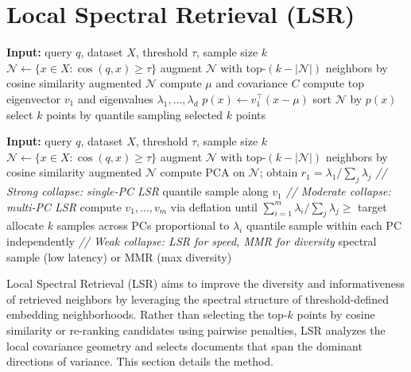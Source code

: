 \documentclass{article}
\begin{document}
\section{Local Spectral Retrieval (LSR)}

\begin{algorithm}[h]
\caption{Local Spectral Retrieval (LSR)}
\begin{algorithmic}
\STATE \textbf{Input:} query $q$, dataset $X$, threshold $\tau$, sample size $k$
\STATE $\mathcal{N} \leftarrow \{ x \in X : \cos(q,x) \geq \tau \}$
  \STATE augment $\mathcal{N}$ with top-$(k - |\mathcal{N}|)$ neighbors by cosine similarity
  \RETURN augmented $\mathcal{N}$
\ENDIF
\STATE compute $\mu$ and covariance $C$
\STATE compute top eigenvector $v_1$ and eigenvalues $\lambda_1, \ldots, \lambda_d$
  \STATE $p(x) \leftarrow v_1^\top (x - \mu)$
\ENDFOR
\STATE sort $\mathcal{N}$ by $p(x)$
\STATE select $k$ points by quantile sampling
\RETURN selected $k$ points
\end{algorithmic}
\end{algorithm}

\begin{algorithm}[h]
\caption{LSR with Spectral Diagnostics (Inner Layer)}
\begin{algorithmic}
\STATE \textbf{Input:} query $q$, dataset $X$, threshold $\tau$, sample size $k$
\STATE $\mathcal{N} \leftarrow \{ x \in X : \cos(q,x) \geq \tau \}$
  \STATE augment $\mathcal{N}$ with top-$(k - |\mathcal{N}|)$ neighbors by cosine similarity
  \RETURN augmented $\mathcal{N}$
\ENDIF
\STATE compute PCA on $\mathcal{N}$; obtain $r_1 = \lambda_1 / \sum_j \lambda_j$
  \STATE \textit{// Strong collapse: single-PC LSR}
  \RETURN quantile sample along $v_1$
  \STATE \textit{// Moderate collapse: multi-PC LSR}
  \STATE compute $v_1, \ldots, v_m$ via deflation until $\sum_{i=1}^{m} \lambda_i / \sum_j \lambda_j \geq$ target
  \STATE allocate $k$ samples across PCs proportional to $\lambda_i$
  \RETURN quantile sample within each PC independently
\ELSE
  \STATE \textit{// Weak collapse: LSR for speed, MMR for diversity}
  \RETURN spectral sample (low latency) or MMR (max diversity)
\ENDIF
\end{algorithmic}
\end{algorithm}

Local Spectral Retrieval (LSR) aims to improve the diversity and informativeness of retrieved neighbors by leveraging the spectral structure of threshold-defined embedding neighborhoods. Rather than selecting the top-$k$ points by cosine similarity or re-ranking candidates using pairwise penalties, LSR analyzes the local covariance geometry and selects documents that span the dominant directions of variance. This section details the method.
\end{document}
